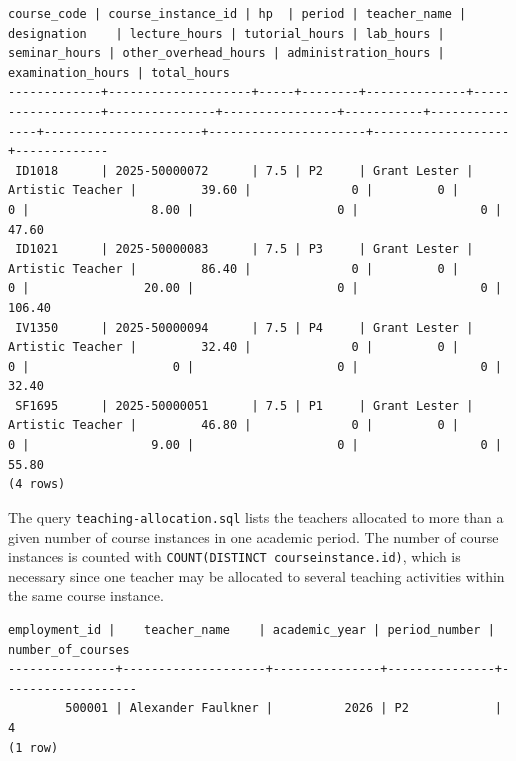 \documentclass[a4paper]{scrartcl}
\renewcommand{\_}{\textunderscore\allowbreak}
\begin{document}
\begin{lstlisting}[style=output, caption={The output of \texttt{actual-hours-calculation-by-teacher.sql} for the teacher Grant Lester}, label={lst:outbyteacher}]
 course_code | course_instance_id | hp  | period | teacher_name |   designation    | lecture_hours | tutorial_hours | lab_hours | seminar_hours | other_overhead_hours | administration_hours | examination_hours | total_hours 
-------------+--------------------+-----+--------+--------------+------------------+---------------+----------------+-----------+---------------+----------------------+----------------------+-------------------+-------------
 ID1018      | 2025-50000072      | 7.5 | P2     | Grant Lester | Artistic Teacher |         39.60 |              0 |         0 |             0 |                 8.00 |                    0 |                 0 |       47.60
 ID1021      | 2025-50000083      | 7.5 | P3     | Grant Lester | Artistic Teacher |         86.40 |              0 |         0 |             0 |                20.00 |                    0 |                 0 |      106.40
 IV1350      | 2025-50000094      | 7.5 | P4     | Grant Lester | Artistic Teacher |         32.40 |              0 |         0 |             0 |                    0 |                    0 |                 0 |       32.40
 SF1695      | 2025-50000051      | 7.5 | P1     | Grant Lester | Artistic Teacher |         46.80 |              0 |         0 |             0 |                 9.00 |                    0 |                 0 |       55.80
(4 rows)
\end{lstlisting}

The query \texttt{teaching-allocation.sql} lists the teachers allocated to more than a given number of course instances in one academic period. The number of course instances is counted with \texttt{COUNT(DISTINCT course\_instance.id)}, which is necessary since one teacher may be allocated to several teaching activities within the same course instance.

\begin{lstlisting}[style=output, caption={The output of \texttt{teaching-allocation.sql} for the teachers with more than 1 course instance in the period P2 of 2026}, label={lst:outthreshold}]
 employment_id |    teacher_name    | academic_year | period_number | number_of_courses
---------------+--------------------+---------------+---------------+-------------------
        500001 | Alexander Faulkner |          2026 | P2            |                 4
(1 row)
\end{lstlisting}
\end{document}
